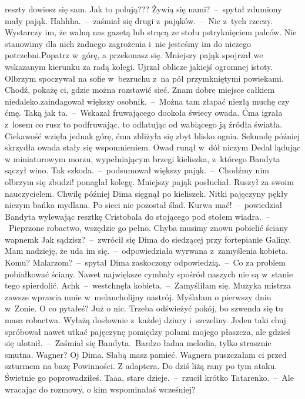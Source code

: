 \documentclass[../MAIN.tex]{subfiles}
\begin{document}
reszty dowiesz się sam.%
\xx  Jak to polują??? Żywią się nami?~--~spytał zdumiony mały pająk.
\xx  Hahhha.~--~zaśmiał się drugi z~pająków.~--~Nic z~tych rzeczy. Wystarczy im,
że walną nas gazetą lub strącą ze stołu pstryknięciem palców. Nie stanowimy dla
nich żadnego zagrożenia i~nie jesteśmy im do niczego potrzebni.Popatrz w~górę, a przekonasz się.
\qd
Mniejszy pająk spojrzał we wskazanym kierunku za radą kolegi. Ujrzał oblicze jakiejś ogromnej
istoty. Olbrzym spoczywał na sofie w~bezruchu z~na pół przymkniętymi powiekami.
\sx
Chodź, pokażę ci, gdzie można rozstawić sieć. Znam dobre miejsce całkiem
niedaleko.\x zaindagował większy osobnik.~--~Można tam złapać niezłą muchę czy
ćmę. Taką jak ta.~--~Wskazał fruwającego dookoła świecy owada. Ćma igrała z~losem
co rusz to podfruwając, to odlatując od wabiącego ją źródła światła. Ciekawość
wzięła jednak górę, ćma zbliżyła się zbyt blisko ognia. Sekundę później skrzydła
owada stały się wspomnieniem. Owad runął w~dół niczym Dedal lądując w
miniaturowym morzu, wypełniającym brzegi kieliszka, z~którego Bandyta sączył
wino.
\xx  Tak szkoda.~--~podsumował większy pająk.~--~Chodźmy nim olbrzym się zbudzi!
ponaglał kolegę.
\qm
Mniejszy pająk posłuchał. Ruszył za swoim nauczycielem. Chwilę później Dima
sięgnął po kieliszek. Nitki pajęczyny pękły niczym bańka mydlana. Po sieci nie
pozostał ślad.
\sx
Kurwa mać!~--~powiedział Bandyta wylewając resztkę Cristobala do stojącego
pod stołem wiadra.~--~Pieprzone robactwo, wszędzie go pełno. Chyba musimy znowu
pobielić ściany wapnem\3k Jak sądzisz?~--~zwrócił się Dima do siedzącej przy
fortepianie Galiny.
\xx  Mam nadzieję, że uda im się.~--~odpowiedziała wyrwana z~zamyślenia kobieta.
\xx  Komu? Malarzom?~--~spytał Dima zaskoczony odpowiedzią.~--~Co za problem
pobiałkować ściany. Nawet największe cymbały spośród naszych nie są w~stanie
tego spierdolić.
\xx  Ach\3k~--~westchnęła kobieta.~--~Zamyśliłam się. Muzyka mistrza zawsze
wprawia mnie w~melancholijny nastrój. Myślałam o pierwszy dniu w~Zonie. O co
pytałeś?
\xx  Już o nic. Trzeba odświeżyć pokój, bo szwenda się tu masa robactwa. Wyłażą
dosłownie z~każdej dziury i~szczeliny. Jeden taki chuj spróbował nawet utkać
pajęczynę pomiędzy połami mojego płaszcza, ale gdzieś się ulotnił.~--~Zaśmiał
się Bandyta.~Bardzo ładna melodia, tylko strasznie smutna. Wagner?
\xx  Oj Dima. Słabą masz pamieć. Wagnera puszczałam ci przed szturmem na bazę
Powinności. Z adaptera. Do dziś liżą rany po tym ataku. Świetnie go
poprowadziłeś.
\xx  Taaa, stare dzieje.~--~rzucił krótko Tatarenko.~--~Ale wracając do rozmowy, o
kim wspominałaś wcześniej?
\end{document}
